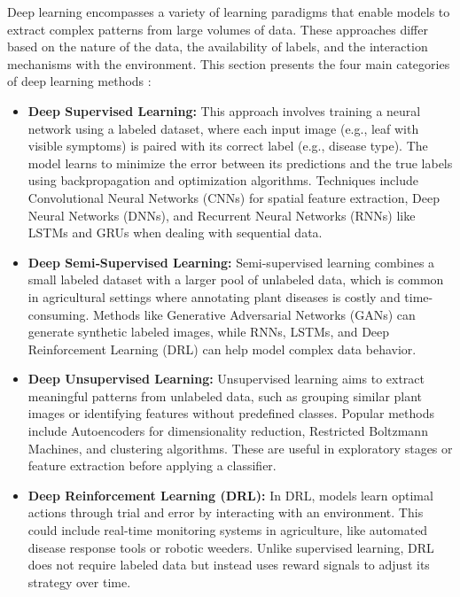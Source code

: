 Deep learning encompasses a variety of learning paradigms that enable models to extract complex patterns from large volumes of data. These approaches differ based on the nature of the data, the availability of labels, and the interaction mechanisms with the environment. This section presents the four main categories of deep learning methods \parencite{alzubaidi2021review}:

\begin{itemize}
    \item \textbf{Deep Supervised Learning:} This approach involves training a neural network using a labeled dataset, where each input image (e.g., leaf with visible symptoms) is paired with its correct label (e.g., disease type). The model learns to minimize the error between its predictions and the true labels using backpropagation and optimization algorithms. Techniques include Convolutional Neural Networks (CNNs) for spatial feature extraction, Deep Neural Networks (DNNs), and Recurrent Neural Networks (RNNs) like LSTMs and GRUs when dealing with sequential data.
    
    \item \textbf{Deep Semi‐Supervised Learning:} Semi-supervised learning combines a small labeled dataset with a larger pool of unlabeled data, which is common in agricultural settings where annotating plant diseases is costly and time-consuming. Methods like Generative Adversarial Networks (GANs) can generate synthetic labeled images, while RNNs, LSTMs, and Deep Reinforcement Learning (DRL) can help model complex data behavior.
    
    \item \textbf{Deep Unsupervised Learning:} Unsupervised learning aims to extract meaningful patterns from unlabeled data, such as grouping similar plant images or identifying features without predefined classes. Popular methods include Autoencoders for dimensionality reduction, Restricted Boltzmann Machines, and clustering algorithms. These are useful in exploratory stages or feature extraction before applying a classifier.
    
    \item \textbf{Deep Reinforcement Learning (DRL):} In DRL, models learn optimal actions through trial and error by interacting with an environment. This could include real-time monitoring systems in agriculture, like automated disease response tools or robotic weeders. Unlike supervised learning, DRL does not require labeled data but instead uses reward signals to adjust its strategy over time.
\end{itemize}

